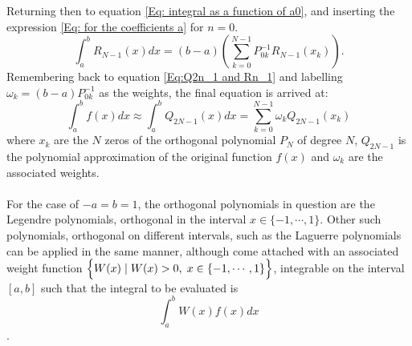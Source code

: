 \documentclass[10pt,a4paper]{article}
\begin{document}
Returning then to equation \ref{Eq: integral as a function of a0}, and inserting the expression \ref{Eq: for the coefficients a} for $n=0$.
\begin{equation}
\int_{a}^bR_{N-1}(x)dx = (b-a)\left( \sum\limits_{k=0}^{N-1}P_{0k}^{-1} R_{N-1}(x_k)\right).
\end{equation}
Remembering back to equation \ref{Eq:Q2n_1 and Rn_1} and labelling $\omega_k =(b-a)P_{0k}^{-1}$ as the weights, the final equation is arrived at:
\begin{equation}
\int_{a}^bf(x)dx \approx \int_{a}^bQ_{2N-1}(x)dx=\sum\limits_{k=0}^{N-1}\omega_k Q_{2N-1}(x_k)
\end{equation}
where $x_k$ are the $N$ zeros of the orthogonal polynomial $P_N$ of degree $N$, $Q_{2N-1}$ is the polynomial approximation of the original function $f(x)$ and $\omega_k$ are the associated weights.\\\\For the case of $-a=b=1$, the orthogonal polynomials in question are the Legendre polynomials, orthogonal in the interval $x\in \{-1,\cdots,1\}$. Other such polynomials, orthogonal on different intervals, such as the Laguerre polynomials can be applied in the same manner, although come attached with an associated weight function $\Big \{W(x)\hspace{1mm}|\hspace{1mm} W(x)>0,\hspace{1mm}x \in \{-1,\cdots,1\}\Big \}$, integrable on the interval $[a,b]$ such that the integral to be evaluated is 
$$
\int_a^b W(x)f(x)dx
$$\cite{Lecture_Notes_Fall_2015}.
\end{document}
